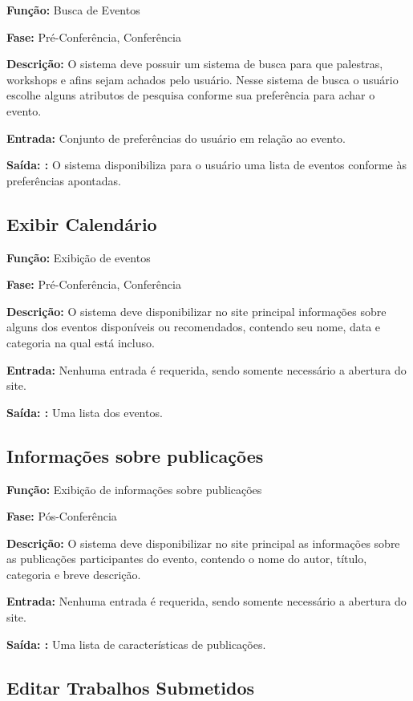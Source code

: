\documentclass[letter]{article}
\begin{document}
\textbf{Função:} Busca de Eventos

\textbf{Fase: } Pré-Conferência, Conferência

\textbf{Descrição: } O sistema deve possuir um sistema de busca para que palestras, workshops e afins sejam achados pelo usuário. Nesse sistema de busca o usuário escolhe alguns atributos de pesquisa conforme sua preferência para achar o evento.

\textbf{Entrada: } Conjunto de preferências do usuário em relação ao evento.

\textbf{Saída: :} O sistema disponibiliza para o usuário uma lista de eventos conforme às preferências apontadas.



\subsection{ Exibir Calendário}

\textbf{Função:} Exibição de eventos

\textbf{Fase: } Pré-Conferência, Conferência

\textbf{Descrição: } O sistema deve disponibilizar no site principal informações sobre alguns dos eventos disponíveis ou recomendados, contendo seu 
nome, data e categoria na qual está incluso.

\textbf{Entrada: } Nenhuma entrada é requerida, sendo somente necessário a
abertura do site.

\textbf{Saída: :} Uma lista dos eventos.



\subsection{Informações sobre publicações}

\textbf{Função:} Exibição de informações sobre publicações

\textbf{Fase: } Pós-Conferência

\textbf{Descrição: } O sistema deve disponibilizar no site principal as informações sobre as publicações participantes do evento, contendo o nome do autor, título, categoria e breve descrição.

\textbf{Entrada: } Nenhuma entrada é requerida, sendo somente necessário a
abertura do site.

\textbf{Saída: :} Uma lista de características de publicações.



\subsection{Editar Trabalhos Submetidos}
\end{document}
